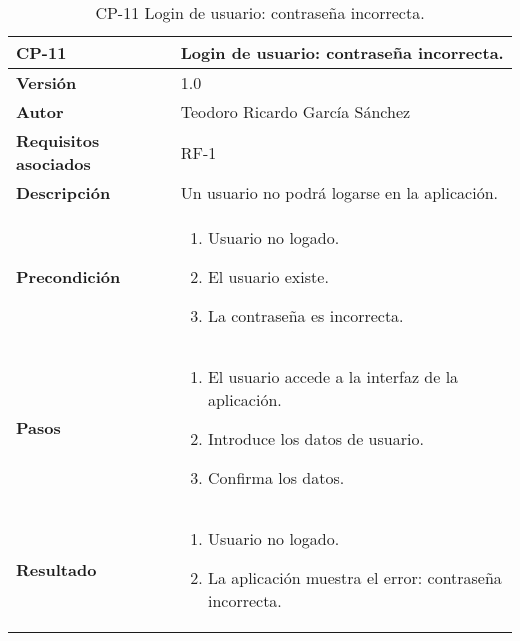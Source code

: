 \begin{table}[p]
	\centering
	\begin{tabularx}{\linewidth}{ p{} p{} }
		\toprule
		\textbf{CP-11}    & \textbf{Login de usuario: contraseña incorrecta.}\\
		\toprule
		\textbf{Versión}              & 1.0    \\
		\textbf{Autor}                & Teodoro Ricardo García Sánchez \\
		\textbf{Requisitos asociados} & RF-1 \\
		\textbf{Descripción}          & Un usuario no podrá logarse en la aplicación. \\
		\textbf{Precondición}         & 
		\begin{enumerate}
			\def\labelenumi{\arabic{enumi}.}
			\tightlist
			\item Usuario no logado.
			\item El usuario existe.
			\item La contraseña es incorrecta.
		\end{enumerate}\\
		\textbf{Pasos}             &
		\begin{enumerate}
			\def\labelenumi{\arabic{enumi}.}
			\tightlist
			\item El usuario accede a la interfaz de la aplicación.
			\item Introduce los datos de usuario.
			\item Confirma los datos.
		\end{enumerate}\\
		\textbf{Resultado}          & 
		\begin{enumerate}
			\item Usuario no logado.
			\item La aplicación muestra el error: contraseña incorrecta.
		\end{enumerate}\\
		\bottomrule
	\end{tabularx}
	\caption{CP-11 Login de usuario: contraseña incorrecta.}
\end{table}

